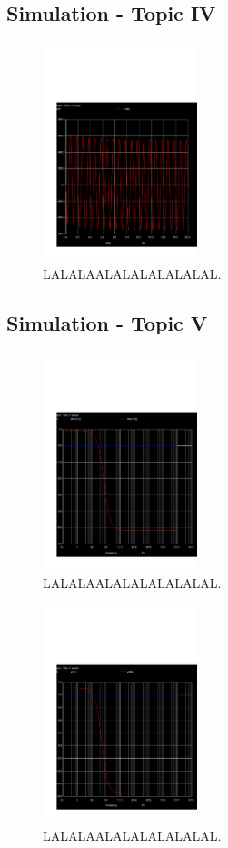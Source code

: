 
\subsection{Simulation - Topic IV}
\label{subsec:sim_fourth}

\begin{figure}[H] \centering
\includegraphics[width=0.4\textwidth]{trans2.pdf}
\caption{LALALAALALALALALALAL.}
\label{fig:LALALAAL}
\end{figure}


\subsection{Simulation - Topic V}
\label{subsec:sim_fifth}

\begin{figure}[H] \centering
\includegraphics[width=0.4\textwidth]{acm.pdf}
\caption{LALALAALALALALALALAL.}
\label{fig:LALALAAL}
\end{figure}


\begin{figure}[H] \centering
\includegraphics[width=0.4\textwidth]{acp.pdf}
\caption{LALALAALALALALALALAL.}
\label{fig:LALALAAL}
\end{figure}


\pagebreak
